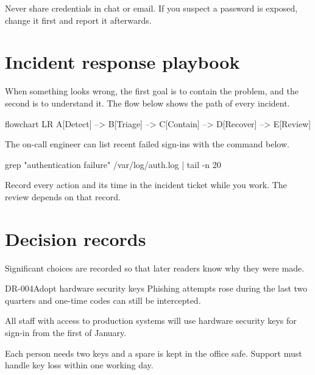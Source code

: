 \begin{warningbox}
  Never share credentials in chat or email. If you suspect a password is
  exposed, change it first and report it afterwards.
\end{warningbox}

\section{Incident response playbook}
When something looks wrong, the first goal is to contain the problem, and the
second is to understand it. The flow below shows the path of every incident.

\begin{mermaid}[style=editorial,width=0.9\linewidth,
    caption={Incident response flow},pos=H]
  flowchart LR
  A[Detect] --> B[Triage] --> C[Contain] --> D[Recover] --> E[Review]
\end{mermaid}

The on-call engineer can list recent failed sign-ins with the command below.\par\vspace{2pt}

\begin{code}[lang=bash]
grep "authentication failure" /var/log/auth.log | tail -n 20
\end{code}

\begin{notebox}
  Record every action and its time in the incident ticket while you work. The
  review depends on that record.
\end{notebox}

\section{Decision records}
Significant choices are recorded so that later readers know why they were made.

\begin{decision}{DR-004}{Adopt hardware security keys}
  \decisionpart{\lblContext}
  Phishing attempts rose during the last two quarters and one-time codes can
  still be intercepted.

  \decisionpart{\lblDecision}
  All staff with access to production systems will use hardware security keys
  for sign-in from the first of January.

  \decisionpart{\lblConsequences}
  Each person needs two keys and a spare is kept in the office safe. Support
  must handle key loss within one working day.
\end{decision}

